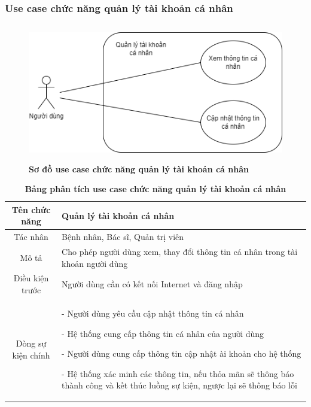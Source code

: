 \subsubsection{Use case chức năng quản lý tài khoản cá nhân}
  \begin{figure}[H]
    \centering
    \includegraphics[width=12cm,height=6cm]{Images/use_case/use_case_manage_info.png}
    \caption[Sơ đồ use case chức năng quản lý tài khoản cá nhân]{\bfseries \fontsize{12pt}{0pt}
    \selectfont Sơ đồ use case chức năng quản lý tài khoản cá nhân}
    \label{use_case_manage_info} %
  \end{figure}

  \begin{table}[H]
    \caption{\bfseries \fontsize{12pt}{0pt}\selectfont Bảng phân tích use case chức năng quản lý tài khoản cá nhân}
    \centering
    \begin{tabularx}{0.9\textwidth}{|c|X|}
      \hline
      \textbf{Tên chức năng} & \textbf{Quản lý tài khoản cá nhân} \\
      \hline
      Tác nhân & Bệnh nhân, Bác sĩ, Quản trị viên \\
      \hline
      Mô tả & Cho phép người dùng xem, thay đổi thông tin cá nhân trong tài khoản người dùng
       \\
      \hline
      Điều kiện trước & Người dùng cần có kết nối Internet và đăng nhập \\
      \hline
      Dòng sự kiện chính & 
        - Người dùng yêu cầu cập nhật thông tin cá nhân

        - Hệ thống cung cấp thông tin cá nhân của người dùng

        - Người dùng cung cấp thông tin cập nhật ài khoản cho hệ thống

        - Hệ thống xác minh các thông tin, nếu thỏa mãn sẽ thông báo thành công và kết thúc luồng sự kiện, ngược lại 
        sẽ thông báo lỗi         
        \\
      \hline
    \end{tabularx}
  \end{table}

